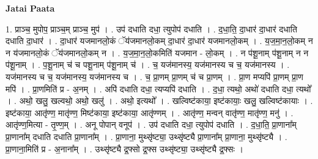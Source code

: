 \documentclass[17pt]{extarticle}
\begin{document}
\textbf{Jatai Paata} \newline

1. प्राञ्च॒ मुपोप॒ प्राञ्च॒म् प्राञ्च॒ मुप॑ । . उप॑ दधाति दधा॒ त्युपोप॑ दधाति । . द॒धा॒ति॒ दा॒धार॑ दा॒धार॑ दधाति दधाति दा॒धार॑ । . दा॒धार॑ यजमानलो॒कं ॅय॑जमानलो॒कम् दा॒धार॑ दा॒धार॑ यजमानलो॒कम् । . य॒ज॒मा॒न॒लो॒कम् न न य॑जमानलो॒कं ॅय॑जमानलो॒कम् न । . य॒ज॒मा॒न॒लो॒कमिति॑ यजमान - लो॒कम् । . न प॑शू॒नाम् प॑शू॒नाम् न न प॑शू॒नाम् । . प॒शू॒नाम् च॑ च पशू॒नाम् प॑शू॒नाम् च॑ । . च॒ यज॑मानस्य॒ यज॑मानस्य च च॒ यज॑मानस्य । . यज॑मानस्य च च॒ यज॑मानस्य॒ यज॑मानस्य च । . च॒ प्रा॒णम् प्रा॒णम् च॑ च प्रा॒णम् । . प्रा॒ण मप्यपि॑ प्रा॒णम् प्रा॒ण मपि॑ । . प्रा॒णमिति॑ प्र - अ॒नम् । . अपि॑ दधाति दधा॒ त्यप्यपि॑ दधाति । . द॒धा॒ त्यथो॒ अथो॑ दधाति दधा॒ त्यथो᳚ । . अथो॒ खलु॒ खल्वथो॒ अथो॒ खलु॑ । . अथो॒ इत्यथो᳚ । . खल्विष्ट॑काया॒ इष्ट॑कायाः॒ खलु॒ खल्विष्ट॑कायाः । . इष्ट॑काया॒ आतृ॑ण्ण॒ मातृ॑ण्ण॒ मिष्ट॑काया॒ इष्ट॑काया॒ आतृ॑ण्णम् । . आतृ॑ण्ण॒ मन्वन् वातृ॑ण्ण॒ मातृ॑ण्ण॒ मनु॑ । . आतृ॑ण्ण॒मित्या - तृ॒ण्ण॒म् । . अनू पोपान् वनूप॑ । . उप॑ दधाति दधा॒ त्युपोप॑ दधाति । . द॒धा॒ति॒ प्रा॒णाना᳚म् प्रा॒णाना᳚म् दधाति दधाति प्रा॒णाना᳚म् । . प्रा॒णाना॒ मुथ्सृ॑ष्ट्या॒ उथ्सृ॑ष्ट्यै प्रा॒णाना᳚म् प्रा॒णाना॒ मुथ्सृ॑ष्ट्यै । . प्रा॒णाना॒मिति॑ प्र - अ॒नाना᳚म् । . उथ्सृ॑ष्ट्यै द्र॒फ्सो द्र॒फ्स उथ्सृ॑ष्ट्या॒ उथ्सृ॑ष्ट्यै द्र॒फ्सः । \newline
\end{document}
